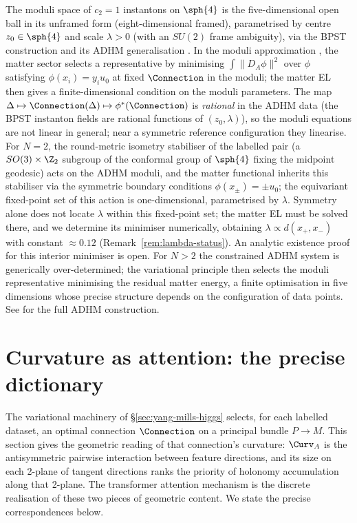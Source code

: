 \begin{proofsketch}
The moduli space of $c_2=1$ instantons on $\sph{4}$ is the
five-dimensional open ball in its unframed form (eight-dimensional
framed), parametrised by centre $z_0\in\sph{4}$ and
scale $\lambda>0$ (with an $SU(2)$ frame ambiguity), via the BPST
construction \cite{BPST1975} and its ADHM generalisation
\cite{ADHM1978,Atiyah1979}. In the moduli approximation
\cite{Manton1982},
the matter sector selects a representative by minimising
$\int\|D_A\phi\|^2$ over $\phi$ satisfying $\phi(x_i)=y_i u_0$ at
fixed $\Connection$ in the moduli; the matter EL then gives a
finite-dimensional condition on the moduli parameters. The map
$\Delta\mapsto\Connection(\Delta)\mapsto\phi^*(\Connection)$ is
\emph{rational} in the ADHM data (the BPST instanton fields are
rational functions of $(z_0,\lambda)$), so the moduli equations are
not linear in general; near a symmetric reference configuration they
linearise. For $N=2$, the round-metric isometry stabiliser of the
labelled pair (a $SO(3)\times\Z_2$ subgroup of the conformal group of
$\sph{4}$ fixing the midpoint geodesic) acts on the ADHM moduli, and
the matter functional inherits this stabiliser via the symmetric
boundary conditions $\phi(x_\pm)=\pm u_0$; the equivariant fixed-point
set of this action is one-dimensional, parametrised by $\lambda$.
Symmetry alone does not locate $\lambda$ within this fixed-point
set; the matter EL must be solved there, and we determine its
minimiser numerically, obtaining $\lambda\propto d(x_+,x_-)$ with
constant $\approx 0.12$ (Remark~\ref{rem:lambda-status}). An
analytic existence proof for this interior minimiser is open. For $N>2$ the constrained ADHM system is generically
over-determined; the variational principle then selects the moduli
representative minimising the residual matter energy, a finite
optimisation in five dimensions whose precise structure depends on
the configuration of data points. See \cite{ADHM1978,Atiyah1979} for
the full ADHM construction.
\end{proofsketch}

\section{Curvature as attention: the precise dictionary}
\label{sec:attention}

The variational machinery of \S\ref{sec:yang-mills-higgs} selects, for
each labelled dataset, an optimal connection $\Connection$ on a
principal bundle $P\to M$. This section gives the geometric reading of
that connection's curvature: $\Curv_A$ is the antisymmetric pairwise
interaction between feature directions, and its size on each 2-plane
of tangent directions ranks the priority of holonomy accumulation
along that 2-plane. The transformer attention mechanism is the
discrete realisation of these two pieces of geometric content. We
state the precise correspondences below.

